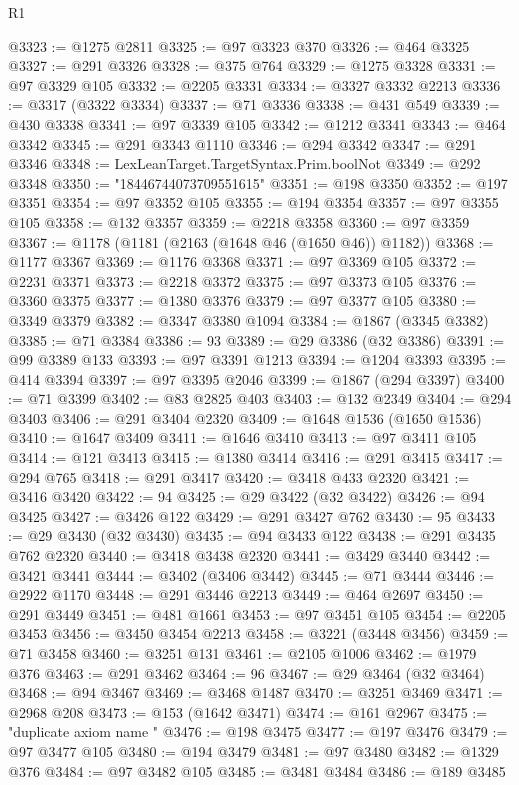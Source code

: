 \begin{lexlean}{R1}
\begin{coremodule}
{{{{{{{{{{{{{{{{{{{{{{{{{{{{{{{{{{{{{{{{{{{{{{{{{{{{{{{{{{{{{{{{{{{{{{{{{{{{{{{{{{{{{{{{{{{{{{{{{{{{{{{{{{{{{{{{{{{{{{{{{{{{{{{{{{{{{{{{{{{{{{{{{{{{{{{{{{{{{{{{{{{{{{{{{{{{{{{{{{{{{{{{{{@3323 := @1275 @2811
@3325 := @97 @3323 @370
@3326 := @464 @3325
@3327 := @291 @3326
@3328 := @375 @764
@3329 := @1275 @3328
@3331 := @97 @3329 @105
@3332 := @2205 @3331
@3334 := @3327 @3332 @2213
@3336 := @3317 (@3322 @3334)
@3337 := @71 @3336
@3338 := @431 @549
@3339 := @430 @3338
@3341 := @97 @3339 @105
@3342 := @1212 @3341
@3343 := @464 @3342
@3345 := @291 @3343 @1110
@3346 := @294 @3342
@3347 := @291 @3346
@3348 := LexLeanTarget.TargetSyntax.Prim.boolNot
@3349 := @292 @3348
@3350 := "18446744073709551615"
@3351 := @198 @3350
@3352 := @197 @3351
@3354 := @97 @3352 @105
@3355 := @194 @3354
@3357 := @97 @3355 @105
@3358 := @132 @3357
@3359 := @2218 @3358
@3360 := @97 @3359
@3367 := @1178 (@1181 (@2163 (@1648 @46 (@1650 @46)) @1182))
@3368 := @1177 @3367
@3369 := @1176 @3368
@3371 := @97 @3369 @105
@3372 := @2231 @3371
@3373 := @2218 @3372
@3375 := @97 @3373 @105
@3376 := @3360 @3375
@3377 := @1380 @3376
@3379 := @97 @3377 @105
@3380 := @3349 @3379
@3382 := @3347 @3380 @1094
@3384 := @1867 (@3345 @3382)
@3385 := @71 @3384
@3386 := 93
@3389 := @29 @3386 (@32 @3386)
@3391 := @99 @3389 @133
@3393 := @97 @3391 @1213
@3394 := @1204 @3393
@3395 := @414 @3394
@3397 := @97 @3395 @2046
@3399 := @1867 (@294 @3397)
@3400 := @71 @3399
@3402 := @83 @2825 @403
@3403 := @132 @2349
@3404 := @294 @3403
@3406 := @291 @3404 @2320
@3409 := @1648 @1536 (@1650 @1536)
@3410 := @1647 @3409
@3411 := @1646 @3410
@3413 := @97 @3411 @105
@3414 := @121 @3413
@3415 := @1380 @3414
@3416 := @291 @3415
@3417 := @294 @765
@3418 := @291 @3417
@3420 := @3418 @433 @2320
@3421 := @3416 @3420
@3422 := 94
@3425 := @29 @3422 (@32 @3422)
@3426 := @94 @3425
@3427 := @3426 @122
@3429 := @291 @3427 @762
@3430 := 95
@3433 := @29 @3430 (@32 @3430)
@3435 := @94 @3433 @122
@3438 := @291 @3435 @762 @2320
@3440 := @3418 @3438 @2320
@3441 := @3429 @3440
@3442 := @3421 @3441
@3444 := @3402 (@3406 @3442)
@3445 := @71 @3444
@3446 := @2922 @1170
@3448 := @291 @3446 @2213
@3449 := @464 @2697
@3450 := @291 @3449
@3451 := @481 @1661
@3453 := @97 @3451 @105
@3454 := @2205 @3453
@3456 := @3450 @3454 @2213
@3458 := @3221 (@3448 @3456)
@3459 := @71 @3458
@3460 := @3251 @131
@3461 := @2105 @1006
@3462 := @1979 @376
@3463 := @291 @3462
@3464 := 96
@3467 := @29 @3464 (@32 @3464)
@3468 := @94 @3467
@3469 := @3468 @1487
@3470 := @3251 @3469
@3471 := @2968 @208
@3473 := @153 (@1642 @3471)
@3474 := @161 @2967
@3475 := "duplicate axiom name "
@3476 := @198 @3475
@3477 := @197 @3476
@3479 := @97 @3477 @105
@3480 := @194 @3479
@3481 := @97 @3480
@3482 := @1329 @376
@3484 := @97 @3482 @105
@3485 := @3481 @3484
@3486 := @189 @3485
}}}}}}}}}}}}}}}}}}}}}}}}}}}}}}}}}}}}}}}}}}}}}}}}}}}}}}}}}}}}}}}}}}}}}}}}}}}}}}}}}}}}}}}}}}}}}}}}}}}}}}}}}}}}}}}}}}}}}}}}}}}}}}}}}}}}}}}}}}}}}}}}}}}}}}}}}}}}}}}}}}}}}}}}}}}}}}}}}}}}}}}}}}
\end{coremodule}
\end{lexlean}
